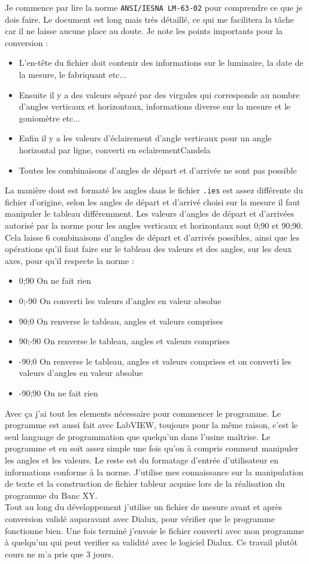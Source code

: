 \documentclass[12pt]{article}
\begin{document}
Je commence par lire la norme \verb|ANSI/IESNA LM-63-02| pour comprendre ce que je dois faire.
Le document est long mais très détaillé, ce qui me facilitera la tâche car il ne laisse aucune place au doute.
Je note les points importants pour la conversion :
\begin{itemize}
	\item L'en-tête du fichier doit contenir des informations sur le luminaire, la date de la mesure, le fabriquant etc...
	\item Ensuite il y a des valeurs séparé par des virgules qui corresponde au nombre d'angles verticaux et horizontaux, informations diverse sur la mesure et le goniomètre etc...
	\item Enfin il y a les valeurs d'éclairement d'angle verticaux pour un angle horizontal par ligne, converti en \gls{eclairementCandela} 
	\item Toutes les combinaisons d'angles de départ et d'arrivée ne sont pas possible
\end{itemize}
La manière dont est formaté les angles dans le fichier \verb|.ies| est assez différente du fichier d'origine, selon les angles de départ et d'arrivé choisi sur la mesure il faut manipuler le tableau différemment.
Les valeurs d'angles de départ et d'arrivées autorisé par la norme pour les angles verticaux et horizontaux sont 0;90 et 90;90.\\
Cela laisse 6 combinaisons d'angles de départ et d'arrivés possibles, ainsi que les opérations qu'il faut faire sur le tableau des valeurs et des angles, sur les deux axes, pour qu'il respecte la norme :
\begin{itemize}
	\item 0;90 On ne fait rien
	\item 0;-90 On converti les valeurs d'angles en valeur absolue
	\item 90;0 On renverse le tableau, angles et valeurs comprises
	\item 90;-90 On renverse le tableau, angles et valeurs comprises
	\item -90;0 On renverse le tableau, angles et valeurs comprises et on converti les valeurs d'angles en valeur absolue
	\item -90;90 On ne fait rien
\end{itemize}


Avec ça j'ai tout les elements nécessaire pour commencer le programme.
Le programme est aussi fait avec LabVIEW, toujours pour la même raison, c'est le seul language de programmation que quelqu'un dans l'usine maîtrise.
Le programme et en soit assez simple une fois qu'on à compris comment manipuler les angles et les valeurs.
Le reste est du formatage d'entrée d'utilisateur en informations conforme à la norme.
J'utilise mes connaissance sur la manipulation de texte et la construction de fichier tableur acquise lors de la réalisation du programme du Banc XY.\\
Tout au long du développement j'utilise un fichier de mesure avant et après conversion validé auparavant avec Dialux, pour vérifier que le programme fonctionne bien.
Une fois terminé j'envoie le fichier converti avec mon programme à quelqu'un qui peut verifier sa validité avec le logiciel Dialux.
Ce travail plutôt cours ne m'a pris que 3 jours.
\end{document}
